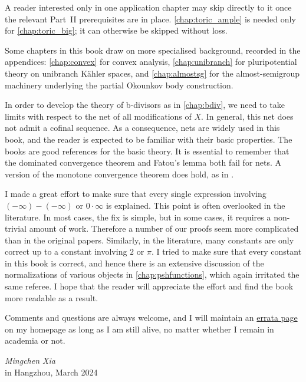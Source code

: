 A reader interested only in one application chapter may skip directly to it once the relevant Part~II prerequisites are in place. \cref{chap:toric_ample} is needed only for \cref{chap:toric_big}; it can otherwise be skipped without loss.

Some chapters in this book draw on more specialised background, recorded in the appendices: \cref{chap:convex} for convex analysis, \cref{chap:unibranch} for pluripotential theory on unibranch K\"ahler spaces, and \cref{chap:almostsg} for the almost-semigroup machinery underlying the partial Okounkov body construction.

In order to develop the theory of b-divisors as in \cref{chap:bdiv}, we need to take limits with respect to the net of all modifications of $X$. In general, this net does not admit a cofinal sequence.
As a consequence, nets are widely used in this book, and the reader is expected to be familiar with their basic properties. The books \cite{Wil70, Kel75} are good references for the basic theory.
It is essential to remember that the dominated convergence theorem and Fatou's lemma both fail for nets. A version of the monotone convergence theorem does hold, as in \cite[Proposition~7.12]{Fol99}.

I made a great effort to make sure that every single expression involving $(-\infty)-(-\infty)$ or $0\cdot \infty$ is explained. This point is often overlooked in the literature. In most cases, the fix is simple, but in some cases, it requires a non-trivial amount of work. Therefore a number of our proofs seem more complicated than in the original papers. Similarly, in the literature, many constants are only correct up to a constant involving $2$ or $\pi$. I tried to make sure that every constant in this book is correct, and hence there is an extensive discussion of the normalizations of various objects in \cref{chap:pshfunctions}, which again irritated the same referee. I hope that the reader will appreciate the effort and find the book more readable as a result.

Comments and questions are always welcome, and I will maintain an \href{https://mingchenxia.github.io/Lectures/Errata_SGPT.pdf}{errata page} on my homepage as long as I am still alive, no matter whether I remain in academia or not.

\vspace{\baselineskip}
\begin{flushright}\noindent
\hfill \textit{Mingchen Xia}\\
in Hangzhou, March 2024\\
\end{flushright}

